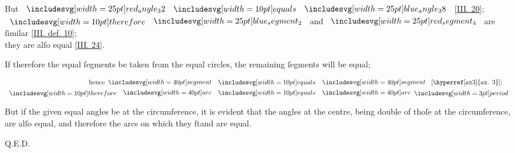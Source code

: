 \documentclass[12pt,preview]{standalone}
\begin{document}
\begin{minipage}[t]{0.64\textwidth}
    \hfill

    \begin{center}
        But $\img{red_angle_32} \bequals \img{blue_angle_38}$ [\hyperref[book3pr20]{\textsc{III.} 20}];\\
        $\btherefore \img{blue_segment_2}$ and $\img{red_segment_4}$ are ſimilar [\hyperref[book3def10]{\textsc{III.} def. 10}];\\
        they are alſo equal [\hyperref[book3pr24]{\textsc{III.} 24}].
    \end{center}
\end{minipage}%

\newpage

\begin{minipage}[t]{0.64\textwidth}
    \vspace{0pt}
    \raggedright If therefore the equal ſegments be taken from the equal circles, the remaining ſegments will be equal;\\

    \hfill

    \begin{center}
        $\begin{aligned}
                \text{hence} \img[0][0][40]{segment} & \bequals \img[0][0][40]{segment} \text{ [\hyperref[ax3]{ax. 3}];} \\
                \btherefore \img[0][0][40]{arc}      & \bequals \img[0][0][40]{arc} \bperiod
            \end{aligned}$
    \end{center}

    \hfill

    \raggedright But if the given equal angles be at the circumference, it is evident that the angles at the centre, being double of thoſe at the circumference, are alſo equal, and therefore the arcs on which they ſtand are equal.

    \hfill

    \hfill Q.E.D.
\end{minipage}
\end{document}

